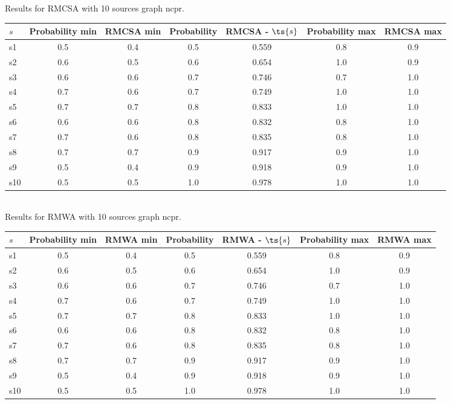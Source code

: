 \documentclass{article}
\begin{document}
\noindent Results for RMCSA with 10 sources graph ncpr.

\noindent\begin{tabular}{|l|c|c|c|c|c|c|}
\hline
$s$& Probability min & RMCSA min & Probability & RMCSA - $\ts{s}$ & Probability max & RMCSA max\\
\hline
s1 &0.5 & 0.4 & 0.5 & 0.559 & 0.8 & 0.9\\
\hline
s2 &0.6 & 0.5 & 0.6 & 0.654 & 1.0 & 0.9\\
\hline
s3 &0.6 & 0.6 & 0.7 & 0.746 & 0.7 & 1.0\\
\hline
s4 &0.7 & 0.6 & 0.7 & 0.749 & 1.0 & 1.0\\
\hline
s5 &0.7 & 0.7 & 0.8 & 0.833 & 1.0 & 1.0\\
\hline
s6 &0.6 & 0.6 & 0.8 & 0.832 & 0.8 & 1.0\\
\hline
s7 &0.7 & 0.6 & 0.8 & 0.835 & 0.8 & 1.0\\
\hline
s8 &0.7 & 0.7 & 0.9 & 0.917 & 0.9 & 1.0\\
\hline
s9 &0.5 & 0.4 & 0.9 & 0.918 & 0.9 & 1.0\\
\hline
s10 &0.5 & 0.5 & 1.0 & 0.978 & 1.0 & 1.0\\
\hline
\end{tabular}\\

\noindent Results for RMWA with 10 sources graph ncpr.

\noindent\begin{tabular}{|l|c|c|c|c|c|c|}
\hline
$s$& Probability min & RMWA min & Probability & RMWA - $\ts{s}$ & Probability max & RMWA max\\
\hline
s1 &0.5 & 0.4 & 0.5 & 0.559 & 0.8 & 0.9\\
\hline
s2 &0.6 & 0.5 & 0.6 & 0.654 & 1.0 & 0.9\\
\hline
s3 &0.6 & 0.6 & 0.7 & 0.746 & 0.7 & 1.0\\
\hline
s4 &0.7 & 0.6 & 0.7 & 0.749 & 1.0 & 1.0\\
\hline
s5 &0.7 & 0.7 & 0.8 & 0.833 & 1.0 & 1.0\\
\hline
s6 &0.6 & 0.6 & 0.8 & 0.832 & 0.8 & 1.0\\
\hline
s7 &0.7 & 0.6 & 0.8 & 0.835 & 0.8 & 1.0\\
\hline
s8 &0.7 & 0.7 & 0.9 & 0.917 & 0.9 & 1.0\\
\hline
s9 &0.5 & 0.4 & 0.9 & 0.918 & 0.9 & 1.0\\
\hline
s10 &0.5 & 0.5 & 1.0 & 0.978 & 1.0 & 1.0\\
\hline
\end{tabular}\\
\end{document}
